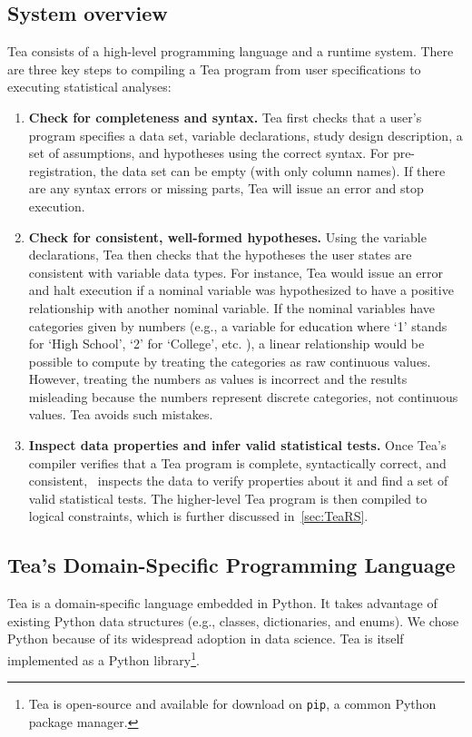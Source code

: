 % 
\subsection{System overview}
\vspace{-5pt}

Tea consists of a high-level programming language and a runtime system. There
are three key steps to compiling a Tea program from user specifications to
executing statistical analyses:

\begin{enumerate}
    \item \textbf{Check for completeness and syntax.} Tea first checks that a
    user's program specifies a data set, variable declarations, study design
    description, a set of assumptions, and hypotheses using the correct syntax.
    For pre-registration, the
    data set can be empty (with only column names). If there are any syntax
    errors or missing parts, Tea will issue an error and stop execution.
    \item \textbf{Check for consistent, well-formed hypotheses.} Using the
    variable declarations, Tea then checks that the hypotheses the user states
    are consistent with variable data types. For instance, Tea would issue an
    error and halt execution if a nominal variable was hypothesized to have a
    positive relationship with another nominal variable. If the nominal
    variables have categories given by numbers (e.g., a variable for education where `1' stands for `High School', `2'
    for `College', etc. ), a linear relationship would be possible to compute by
    treating the categories as raw continuous values. However, treating the numbers as
    values is incorrect and the results misleading because the numbers represent
    discrete categories, not continuous values. Tea avoids such mistakes.
    \item \textbf{Inspect data properties and infer valid statistical tests.}
    Once Tea's compiler verifies that a Tea program is complete, syntactically
    correct, and consistent, \TeaRS~inspects the data to verify properties
    about it and find a set of valid statistical tests. The
    higher-level Tea program is then compiled to logical constraints, which is
    further discussed in~\autoref{sec:TeaRS}.
\end{enumerate}

\vspace{-5pt}
\subsection{Tea's Domain-Specific Programming Language} \label{sec:TeaPL}
Tea is a domain-specific language
embedded in Python. It takes advantage of existing Python data structures (e.g.,
classes, dictionaries, and enums). We chose Python because of its widespread
adoption in data science. Tea is itself implemented as a Python library\footnote{Tea is open-source and available for download on
\texttt{pip}, a common Python package manager.}.

